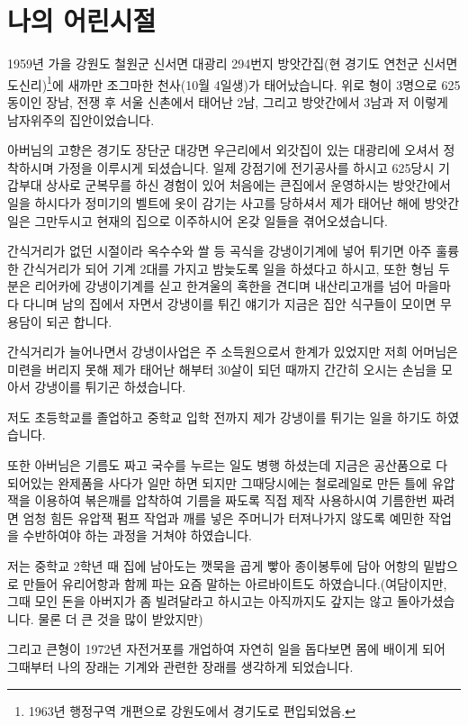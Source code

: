 \documentclass[chapter,book,openany,twoside]{oblivoir}
\begin{document}
\chapter{나의 어린시절}

1959년 가을 강원도 철원군 신서면 대광리 294번지 방앗간집(현 경기도 연천군 신서면 도신리)\footnote{1963년 행정구역 개편으로 강원도에서 경기도로 편입되었음.}에 새까만 조그마한 천사(10월 4일생)가 태어났습니다. 위로 형이 3명으로 625동이인 장남, 전쟁 후 서울 신촌에서 태어난 2남, 그리고 방앗간에서 3남과 저 이렇게 남자위주의 집안이었습니다.

아버님의 고향은 경기도 장단군 대강면 우근리에서 외갓집이 있는 대광리에 오셔서 정착하시며 가정을 이루시게 되셨습니다.  일제 강점기에 전기공사를 하시고 625당시 기갑부대 상사로 군복무를 하신 경험이 있어 처음에는 큰집에서 운영하시는 방앗간에서 일을 하시다가 정미기의 벨트에 옷이 감기는 사고를 당하셔서 제가 태어난 해에 방앗간 일은 그만두시고 현재의 집으로 이주하시어 온갖 일들을 겪어오셨습니다.

간식거리가 없던 시절이라 옥수수와 쌀 등 곡식을 강냉이기계에 넣어 튀기면 아주 훌륭한 간식거리가 되어 기계 2대를 가지고 밤늦도록 일을 하셨다고 하시고, 또한 형님 두 분은 리어카에 강냉이기계를 싣고 한겨울의 혹한을 견디며 내산리고개를 넘어 마을마다 다니며 남의 집에서 자면서 강냉이를 튀긴 얘기가 지금은 집안 식구들이 모이면 무용담이 되곤 합니다.

간식거리가 늘어나면서 강냉이사업은 주 소득원으로서 한계가 있었지만 저희 어머님은 미련을 버리지 못해 제가 태어난 해부터 30살이 되던 때까지 간간히 오시는 손님을 모아서 강냉이를 튀기곤 하셨습니다.

저도 초등학교를 졸업하고 중학교 입학 전까지 제가 강냉이를 튀기는 일을 하기도 하였습니다.

또한 아버님은 기름도 짜고 국수를 누르는 일도 병행 하셨는데 지금은 공산품으로 다 되어있는 완제품을 사다가 일만 하면 되지만 그때당시에는 철로레일로 만든 틀에 유압잭을 이용하여 볶은깨를 압착하여 기름을 짜도록 직접 제작 사용하시여 기름한번 짜려면 엄청 힘든 유압잭 펌프 작업과 깨를 넣은 주머니가 터져나가지 않도록 예민한 작업을 수반하여야 하는 과정을 거쳐야 하였습니다.

저는 중학교 2학년 때 집에 남아도는 깻묵을 곱게 빻아 종이봉투에 담아 어항의 밑밥으로 만들어 유리어항과 함께 파는 요즘 말하는 아르바이트도 하였습니다.(여담이지만, 그때 모인 돈을 아버지가 좀 빌려달라고 하시고는 아직까지도 갚지는 않고 돌아가셨습니다. 물론 더 큰 것을 많이 받았지만)

그리고 큰형이 1972년 자전거포를 개업하여 자연히 일을 돕다보면 몸에 배이게 되어 그때부터 나의 장래는 기계와 관련한 장래를 생각하게 되었습니다.
\end{document}

